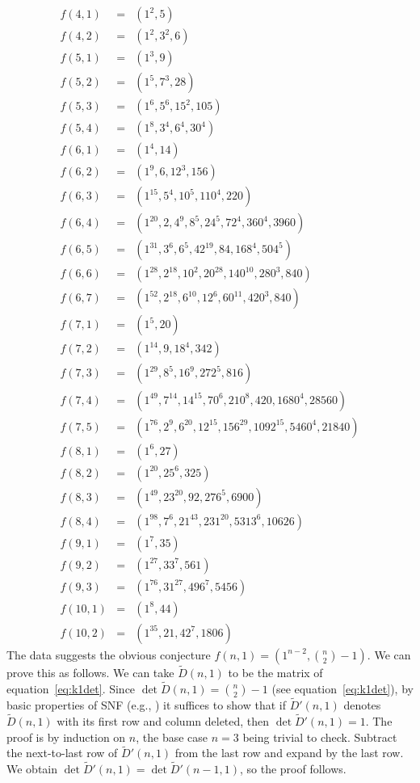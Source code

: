 \documentclass[12pt]{amsart}
\theoremstyle{definition}
\theoremstyle{remark}
\numberwithin{equation}{section}
\begin{document}
   \begin{eqnarray*} f(4,1) & = & (1^2,5)\\
   f(4,2) & = & (1^2,3^2,6)\\
   f(5,1) & = & (1^3,9)\\
   f(5,2) & = & (1^5,7^3,28)\\
   f(5,3) & = & (1^6,5^6,15^2,105)\\
   f(5,4) & = & (1^8,3^4,6^4,30^4)\\
   f(6,1) & = & (1^4,14)\\
   f(6,2) & = & (1^9,6,12^3,156)\\
   f(6,3) & = & (1^{15},5^4,10^5,110^4,220)\\
   f(6,4) & = & (1^{20},2,4^9,8^5,24^5,72^4,360^4,3960)\\
   f(6,5) & = & (1^{31},3^6,6^5,42^{19},84,168^4,504^5)\\
   f(6,6) & = & (1^{28},2^{18},10^2,20^{28},140^{10},280^3,840)\\
   f(6,7) & = & (1^{52},2^{18},6^{10},12^6,60^{11},420^3,840)\\
   f(7,1) & = & (1^5,20)\\
   f(7,2) & = & (1^{14},9,18^4,342)\\
   f(7,3) & = & (1^{29},8^5,16^9,272^5,816)\\
   f(7,4) & = & (1^{49},7^{14},14^{15},70^6,210^8,420,1680^4,28560)\\
   f(7,5) & = &
    (1^{76},2^9,6^{20},12^{15},156^{29},1092^{15},5460^4,21840)\\
   f(8,1) & = & (1^6,27)\\
   f(8,2) & = & (1^{20},25^6,325)\\
   f(8,3) & = & (1^{49},23^{20},92,276^5,6900)\\
   f(8,4) & = & (1^{98},7^6,21^{43},231^{20},5313^6,10626)\\
   f(9,1) & = & (1^7,35)\\
   f(9,2) & = & (1^{27},33^7,561)\\
   f(9,3) & = & (1^{76},31^{27},496^7,5456)\\
   f(10,1) & = & (1^8,44)\\
   f(10,2) & = & (1^{35},21,42^7,1806)
   \end{eqnarray*}
The data suggests the obvious conjecture $f(n,1)=(1^{n-2},\binom
n2-1)$. We can prove this as follows. We can take $\tilde{D}(n,1)$ to
be the matrix of equation~\eqref{eq:k1det}. Since $\det
\tilde{D}(n,1)=\binom n2-1$ (see equation~\eqref{eq:k1det}), by basic
properties of SNF (e.g., \cite[Thm.~2.4]{rs:snf}) it suffices to show
that if $\tilde{D}'(n,1)$ denotes $\tilde{D}(n,1)$ with its first row
and column deleted, then $\det \tilde{D}'(n,1)=1$. The proof is by
induction on $n$, the base case $n=3$ being trivial to check. Subtract
the next-to-last row of $\tilde{D}'(n,1)$ from the last row and expand
by the last row. We obtain $\det \tilde{D}'(n,1)=\det
\tilde{D}'(n-1,1)$, so the proof follows.
\end{document}
